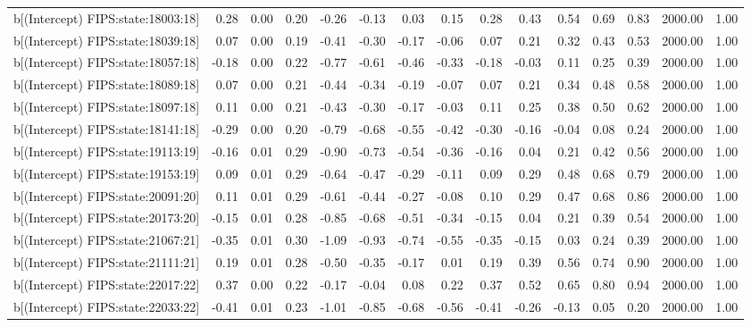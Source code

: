 \begin{table}[ht]
\begin{tabular}{rrrrrrrrrrrrrrr}
  b[(Intercept) FIPS:state:18003:18] & 0.28 & 0.00 & 0.20 & -0.26 & -0.13 & 0.03 & 0.15 & 0.28 & 0.43 & 0.54 & 0.69 & 0.83 & 2000.00 & 1.00 \\ 
  b[(Intercept) FIPS:state:18039:18] & 0.07 & 0.00 & 0.19 & -0.41 & -0.30 & -0.17 & -0.06 & 0.07 & 0.21 & 0.32 & 0.43 & 0.53 & 2000.00 & 1.00 \\ 
  b[(Intercept) FIPS:state:18057:18] & -0.18 & 0.00 & 0.22 & -0.77 & -0.61 & -0.46 & -0.33 & -0.18 & -0.03 & 0.11 & 0.25 & 0.39 & 2000.00 & 1.00 \\ 
  b[(Intercept) FIPS:state:18089:18] & 0.07 & 0.00 & 0.21 & -0.44 & -0.34 & -0.19 & -0.07 & 0.07 & 0.21 & 0.34 & 0.48 & 0.58 & 2000.00 & 1.00 \\ 
  b[(Intercept) FIPS:state:18097:18] & 0.11 & 0.00 & 0.21 & -0.43 & -0.30 & -0.17 & -0.03 & 0.11 & 0.25 & 0.38 & 0.50 & 0.62 & 2000.00 & 1.00 \\ 
  b[(Intercept) FIPS:state:18141:18] & -0.29 & 0.00 & 0.20 & -0.79 & -0.68 & -0.55 & -0.42 & -0.30 & -0.16 & -0.04 & 0.08 & 0.24 & 2000.00 & 1.00 \\ 
  b[(Intercept) FIPS:state:19113:19] & -0.16 & 0.01 & 0.29 & -0.90 & -0.73 & -0.54 & -0.36 & -0.16 & 0.04 & 0.21 & 0.42 & 0.56 & 2000.00 & 1.00 \\ 
  b[(Intercept) FIPS:state:19153:19] & 0.09 & 0.01 & 0.29 & -0.64 & -0.47 & -0.29 & -0.11 & 0.09 & 0.29 & 0.48 & 0.68 & 0.79 & 2000.00 & 1.00 \\ 
  b[(Intercept) FIPS:state:20091:20] & 0.11 & 0.01 & 0.29 & -0.61 & -0.44 & -0.27 & -0.08 & 0.10 & 0.29 & 0.47 & 0.68 & 0.86 & 2000.00 & 1.00 \\ 
  b[(Intercept) FIPS:state:20173:20] & -0.15 & 0.01 & 0.28 & -0.85 & -0.68 & -0.51 & -0.34 & -0.15 & 0.04 & 0.21 & 0.39 & 0.54 & 2000.00 & 1.00 \\ 
  b[(Intercept) FIPS:state:21067:21] & -0.35 & 0.01 & 0.30 & -1.09 & -0.93 & -0.74 & -0.55 & -0.35 & -0.15 & 0.03 & 0.24 & 0.39 & 2000.00 & 1.00 \\ 
  b[(Intercept) FIPS:state:21111:21] & 0.19 & 0.01 & 0.28 & -0.50 & -0.35 & -0.17 & 0.01 & 0.19 & 0.39 & 0.56 & 0.74 & 0.90 & 2000.00 & 1.00 \\ 
  b[(Intercept) FIPS:state:22017:22] & 0.37 & 0.00 & 0.22 & -0.17 & -0.04 & 0.08 & 0.22 & 0.37 & 0.52 & 0.65 & 0.80 & 0.94 & 2000.00 & 1.00 \\ 
  b[(Intercept) FIPS:state:22033:22] & -0.41 & 0.01 & 0.23 & -1.01 & -0.85 & -0.68 & -0.56 & -0.41 & -0.26 & -0.13 & 0.05 & 0.20 & 2000.00 & 1.00 \\ 

\end{tabular}
\end{table}
